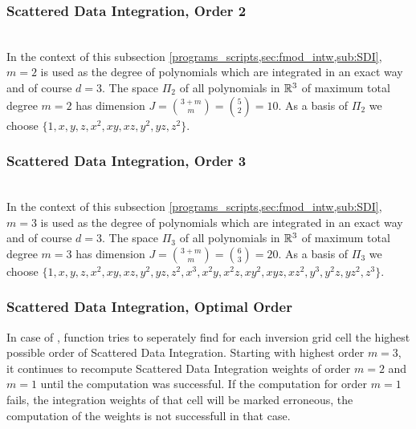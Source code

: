 \subsubsection{Scattered Data Integration, Order 2}
%
\\
In the context of this subsection \ref{programs_scripts,sec:fmod_intw,sub:SDI}, $m=2$ is used as the 
degree of polynomials which are integrated in an exact way and of course $d=3$. The space $\Pi_2$ of all polynomials in 
$\mathbb{R}^3$ of maximum total degree $m=2$ has dimension $J = \binom{3+m}{m} = \binom{5}{2} = 10$. As a basis of $\Pi_2$ we choose $\big\{1,
\allowbreak x,\allowbreak y,\allowbreak z,\allowbreak x^2,\allowbreak xy,\allowbreak xz,\allowbreak y^2,
\allowbreak yz,\allowbreak  z^2\big\}$.
%
\subsubsection{Scattered Data Integration, Order 3}
%
\\
In the context of this subsection \ref{programs_scripts,sec:fmod_intw,sub:SDI}, $m=3$ is used as the 
degree of polynomials which are integrated in an exact way and of course $d=3$. The space $\Pi_3$ of all polynomials in 
$\mathbb{R}^3$ of maximum total degree $m=3$ has dimension $J = \binom{3+m}{m} = \binom{6}{3} = 20$. As a basis of $\Pi_3$ we choose $\big\{1,
\allowbreak x,\allowbreak y,\allowbreak z,\allowbreak x^2,\allowbreak xy,\allowbreak xz,\allowbreak y^2,
\allowbreak yz,\allowbreak  z^2,\allowbreak x^3,\allowbreak  x^2y,\allowbreak  x^2z,\allowbreak  xy^2,
\allowbreak  xyz,\allowbreak  xz^2,\allowbreak  y^3,\allowbreak  y^2z,\allowbreak  yz^2,\allowbreak  
z^3\big\}$.
%
\subsubsection{Scattered Data Integration, Optimal Order}
%
In case of , function  tries to seperately 
find for each inversion grid cell the highest possible order of Scattered Data Integration. 
Starting with highest order $m=3$, it continues to recompute Scattered Data Integration weights of 
order $m = 2$ and $m = 1$ until the computation was successful. If the computation for order $m=1$ 
fails, the integration weights of that cell will be marked erroneous, the computation of the weights
is not successfull in that case.

